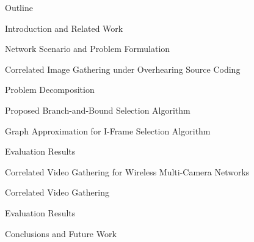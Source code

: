 \begin{frame}{Outline}
\begin{itemize}
{\color{myDarkBlue}\item[] Introduction and Related Work}
{\color{myDarkBlue}\item[] Network Scenario and Problem Formulation}
{\color{myDarkBlue}\item[] Correlated Image Gathering under Overhearing Source Coding}
\begin{itemize}
	{\small \item[] Problem Decomposition}
	{\small \item[] Proposed Branch-and-Bound Selection Algorithm}
	{\small \item[] Graph Approximation for I-Frame Selection Algorithm}
	{\small \item[] Evaluation Results}
\end{itemize}
{\color{myDarkBlue}\item[] Correlated Video Gathering for Wireless Multi-Camera Networks}
\begin{itemize}
	{\small \item[] Correlated Video Gathering}
	{\small \item[] Evaluation Results}
\end{itemize}
{\color{myDarkBlue}\item[] Conclusions and Future Work}
\end{itemize}
\end{frame}
